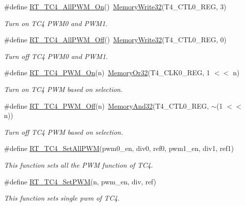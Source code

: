 \begin{DoxyCompactItemize}
\item 
\#define \mbox{\hyperlink{a00050_af7e9317dddf60349a86619afdef1fba8}{R\+T\+\_\+\+T\+C4\+\_\+\+All\+P\+W\+M\+\_\+\+On}}()~\mbox{\hyperlink{a00020_a6b9732365b12e48ddb89fe1028b975b0}{Memory\+Write32}}(T4\+\_\+\+C\+T\+L0\+\_\+\+R\+EG, 3)
\begin{DoxyCompactList}\small\item\em Turn on T\+C4 P\+W\+M0 and P\+W\+M1. \end{DoxyCompactList}\item 
\#define \mbox{\hyperlink{a00050_a810820140a90f26db974ea72d81fac27}{R\+T\+\_\+\+T\+C4\+\_\+\+All\+P\+W\+M\+\_\+\+Off}}()~\mbox{\hyperlink{a00020_a6b9732365b12e48ddb89fe1028b975b0}{Memory\+Write32}}(T4\+\_\+\+C\+T\+L0\+\_\+\+R\+EG, 0)
\begin{DoxyCompactList}\small\item\em Turn off T\+C4 P\+W\+M0 and P\+W\+M1. \end{DoxyCompactList}\item 
\#define \mbox{\hyperlink{a00050_a383c7817a2e822ccda0e28744c7d3d76}{R\+T\+\_\+\+T\+C4\+\_\+\+P\+W\+M\+\_\+\+On}}(n)~\mbox{\hyperlink{a00020_a27874a97deab7cecdde5ddecf466e31e}{Memory\+Or32}}(T4\+\_\+\+C\+L\+K0\+\_\+\+R\+EG, 1 $<$$<$ n)
\begin{DoxyCompactList}\small\item\em Turn on T\+C4 P\+WM based on selection. \end{DoxyCompactList}\item 
\#define \mbox{\hyperlink{a00050_aaa61aa650a6b2f59bbcb78ae836c82e9}{R\+T\+\_\+\+T\+C4\+\_\+\+P\+W\+M\+\_\+\+Off}}(n)~\mbox{\hyperlink{a00020_ad87cedffcaadc51db22594fce55173d4}{Memory\+And32}}(T4\+\_\+\+C\+T\+L0\+\_\+\+R\+EG, $\sim$(1 $<$$<$ n))
\begin{DoxyCompactList}\small\item\em Turn off T\+C4 P\+WM based on selection. \end{DoxyCompactList}\item 
\#define \mbox{\hyperlink{a00050_ad6b804bb230129a442fe9ce55e3bd2f6}{R\+T\+\_\+\+T\+C4\+\_\+\+Set\+All\+P\+WM}}(pwm0\+\_\+en,  div0,  ref0,  pwm1\+\_\+en,  div1,  ref1)
\begin{DoxyCompactList}\small\item\em This function sets all the P\+WM function of T\+C4. \end{DoxyCompactList}\item 
\#define \mbox{\hyperlink{a00050_ada2806f77e8e1cf7e64c5b9e13479119}{R\+T\+\_\+\+T\+C4\+\_\+\+Set\+P\+WM}}(n,  pwm\+\_\+en,  div,  ref)
\begin{DoxyCompactList}\small\item\em This function sets single pwm of T\+C4. \end{DoxyCompactList}\end{DoxyCompactItemize}


